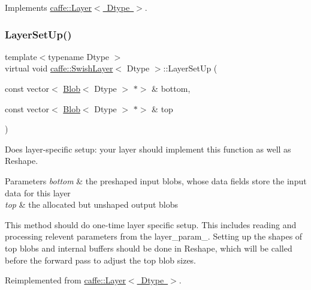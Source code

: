 Implements \mbox{\hyperlink{classcaffe_1_1_layer_a576ac6a60b1e99fe383831f52a6cea77}{caffe\+::\+Layer$<$ Dtype $>$}}.

\mbox{\label{classcaffe_1_1_swish_layer_a04035cc9ca9be4b99aba41197b16f2e4}} 
\subsubsection{\texorpdfstring{Layer\+Set\+Up()}{LayerSetUp()}\hspace{0.1cm}{\footnotesize\ttfamily [1/2]}}
{\footnotesize\ttfamily template$<$typename Dtype $>$ \\
virtual void \mbox{\hyperlink{classcaffe_1_1_swish_layer}{caffe\+::\+Swish\+Layer}}$<$ Dtype $>$\+::Layer\+Set\+Up (\begin{DoxyParamCaption}\item[{const vector$<$ \mbox{\hyperlink{classcaffe_1_1_blob}{Blob}}$<$ Dtype $>$ $\ast$$>$ \&}]{bottom,  }\item[{const vector$<$ \mbox{\hyperlink{classcaffe_1_1_blob}{Blob}}$<$ Dtype $>$ $\ast$$>$ \&}]{top }\end{DoxyParamCaption})\hspace{0.3cm}{\ttfamily [virtual]}}



Does layer-\/specific setup\+: your layer should implement this function as well as Reshape. 


\begin{DoxyParams}{Parameters}
{\em bottom} & the preshaped input blobs, whose data fields store the input data for this layer \\
\hline
{\em top} & the allocated but unshaped output blobs\\
\hline
\end{DoxyParams}
This method should do one-\/time layer specific setup. This includes reading and processing relevent parameters from the {\ttfamily layer\+\_\+param\+\_\+}. Setting up the shapes of top blobs and internal buffers should be done in {\ttfamily Reshape}, which will be called before the forward pass to adjust the top blob sizes. 

Reimplemented from \mbox{\hyperlink{classcaffe_1_1_layer_a481323a3e0972c682787f2137468c29f}{caffe\+::\+Layer$<$ Dtype $>$}}.

